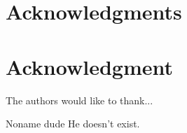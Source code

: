 \documentclass[12pt,journal,captionsoff,onecolumn]{IEEEtran}
\newcommand\1{\vec 1}
\begin{document}
\appendices



\ifCLASSOPTIONcompsoc
  \section*{Acknowledgments}
\else
  \section*{Acknowledgment}
\fi


The authors would like to thank...


\ifCLASSOPTIONcaptionsoff
  \newpage
\fi








% 
% 



% 

\vfill 

\begin{IEEEbiography}{Noname dude}
He doesn't exist.
\end{IEEEbiography}
\end{document}
